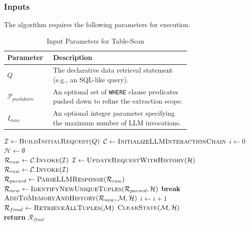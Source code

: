 \subsubsection{Inputs}
The algorithm requires the following parameters for execution:

\begin{table}[H]
    \centering
    \begin{tabular}{|l|p{0.75\linewidth}|}
        \hline
        \textbf{Parameter} & \textbf{Description} \\
        \hline
        $Q$ & The declarative data retrieval statement (e.g., an SQL-like query). \\
        \hline
        $\mathcal{P}_{pushdown}$ & An optional set of \texttt{WHERE} clause predicates pushed down to refine the extraction scope. \\
        \hline
        $I_{max}$ & An optional integer parameter specifying the maximum number of LLM invocations. \\
        \hline
    \end{tabular}
    \caption{Input Parameters for Table-Scan}
    \label{tab:table_scan_inputs}
\end{table}

\begin{algorithm}
\caption{Table-Scan Algorithm}
\label{alg:table_scan}
\begin{algorithmic}[1]
    \State $\mathcal{I} \gets \Call{BuildInitialRequest}{Q}$
    \State $\mathcal{C} \gets \Call{InitializeLLMInteractionChain}{}$
    \State $i \gets 0$
    \State $\mathcal{H} \gets \emptyset$
    \\
            \State $\mathcal{R}_{raw} \gets \mathcal{C}.\Call{Invoke}{\mathcal{I}}$
        \Else
            \State $\mathcal{I} \gets \Call{UpdateRequestWithHistory}{\mathcal{H}}$
            \State $\mathcal{R}_{raw} \gets \mathcal{C}.\Call{Invoke}{\mathcal{I}}$
        \EndIf
        \\
        \State $\mathcal{R}_{parsed} \gets \Call{ParseLLMResponse}{\mathcal{R}_{raw}}$
        \State $\mathcal{R}_{new} \gets \Call{IdentifyNewUniqueTuples}{\mathcal{R}_{parsed}, \mathcal{H}}$
            \State \textbf{break}
        \EndIf
        \\
        \State $\Call{AddToMemoryAndHistory}{\mathcal{R}_{new}, \mathcal{M}, \mathcal{H}}$
        \State $i \gets i + 1$
    \EndWhile
    \\
    \State $\mathcal{R}_{final} \gets \Call{RetrieveAllTuples}{\mathcal{M}}$
    \State $\Call{ClearState}{\mathcal{M}, \mathcal{H}}$
    \\
    \State \textbf{return} $\mathcal{R}_{final}$
\EndFunction
\end{algorithmic}
\end{algorithm}

